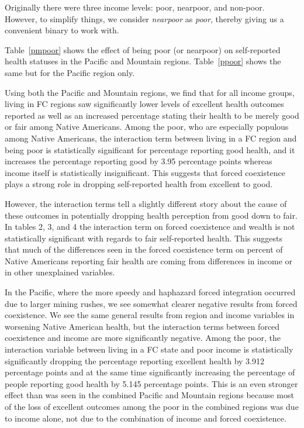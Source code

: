 \documentclass[12pt]{article}
\begin{document}
Originally there were three income levels: poor, nearpoor, and non-poor.
However, to simplify things, we consider \emph{nearpoor} as \emph{poor}, thereby giving us a convenient binary to work with.

Table~\ref{pmpoor} shows the effect of being poor (or nearpoor) on self-reported health statuses in the Pacific and Mountain regions.
Table~\ref{ppoor} shows the same but for the Pacific region only.

Using both the Pacific and Mountain regions, we find that for all income groups, living in FC regions saw significantly lower levels of excellent health outcomes reported as well as an increased percentage stating their health to be merely good or fair among Native Americans.
Among the poor, who are especially populous among Native Americans, the interaction term between living in a FC region and being poor is statistically significant for percentage reporting good health, and it increases the percentage reporting good by 3.95 percentage points whereas income itself is statistically insignificant.
This suggests that forced coexistence plays a strong role in dropping self-reported health from excellent to good.

However, the interaction terms tell a slightly different story about the cause of these outcomes in potentially dropping health perception from good down to fair. 
In tables 2, 3, and 4 the interaction term on forced coexistence and wealth is not statistically significant with regards to fair self-reported health. 
This suggests that much of the differences seen in the forced coexistence term on percent of Native Americans reporting fair health are coming from differences in income or in other unexplained variables.  

In the Pacific, where the more speedy and haphazard forced integration occurred due to larger mining rushes, we see somewhat clearer negative results from forced coexistence. 
We see the same general results from region and income variables in worsening Native American health, but the interaction terms between forced coexistence and income are more significantly negative.  
Among the poor, the interaction variable between living in a FC state and poor income is statistically significantly dropping the percentage reporting excellent health by 3.912 percentage points and at the same time significantly increasing the percentage of people reporting good health by 5.145 percentage points.  
This is an even stronger effect than was seen in the combined Pacific and Mountain regions because most of the loss of excellent outcomes among the poor in the combined regions was due to income alone, not due to the combination of income and forced coexistence.
\end{document}
